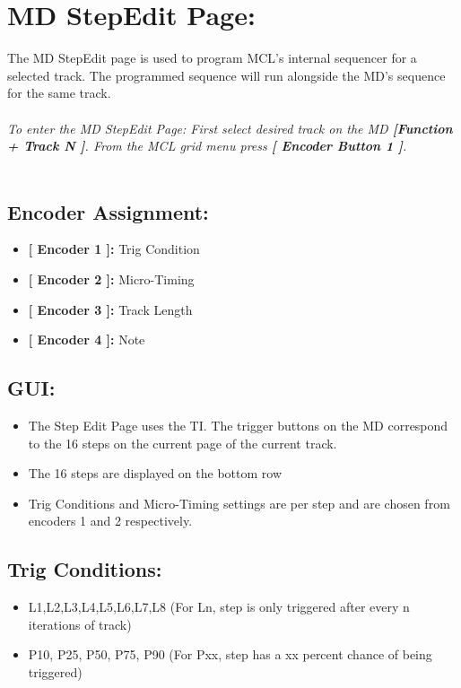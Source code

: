 \chapter{MD StepEdit Page:}

The MD StepEdit page is used to program MCL's internal sequencer for a selected track. The programmed sequence will run alongside the MD's sequence for the same track.\\
\\\textit{To enter the MD StepEdit Page: First select desired track on the MD \textbf{[Function + Track N ]}. From the MCL grid menu press \textbf{[ Encoder Button 1 ]}.}\\
\\
\section{Encoder Assignment:}
\begin{itemize}
	\item \textbf{[ Encoder 1 ]: } Trig Condition
	\item \textbf{[ Encoder 2 ]: } Micro-Timing
	\item \textbf{[ Encoder 3 ]: } Track Length
	\item \textbf{[ Encoder 4 ]: } Note
\end{itemize}
\section{GUI:}
\begin{itemize}
\item The Step Edit Page uses the TI. The trigger buttons on the MD correspond to the 16 steps on the current page of the current track.
\item The 16 steps are displayed on the bottom row
\item Trig Conditions and Micro-Timing settings are per step and are chosen from encoders 1 and 2 respectively.
\end{itemize}
\section{Trig Conditions:}
\begin{itemize}
\item L1,L2,L3,L4,L5,L6,L7,L8 (For Ln, step is only triggered after every n iterations of track)
\item P10, P25, P50, P75, P90 (For Pxx, step has a xx percent chance of being triggered)
\end{itemize}
